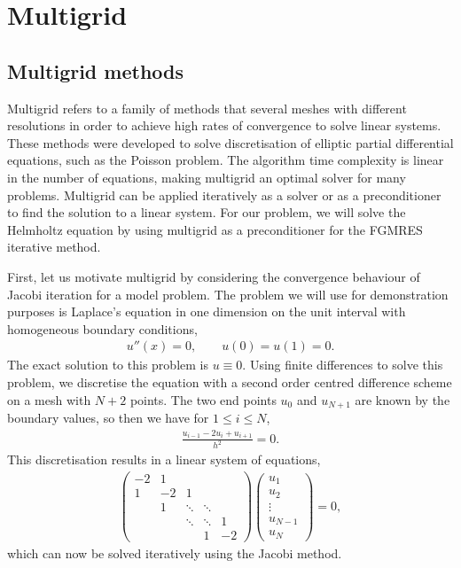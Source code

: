 \chapter{Multigrid}
\label{sec:mg}


\section{Multigrid methods}

Multigrid refers to a family of methods that several meshes with different resolutions in order to achieve high rates of convergence to solve linear systems.
These methods were developed to solve discretisation of elliptic partial differential equations, such as the Poisson problem.
The algorithm time complexity is linear in the number of equations, making multigrid an optimal solver for many problems.
Multigrid can be applied iteratively as a solver or as a preconditioner to find the solution to a linear system.
For our problem, we will solve the Helmholtz equation by using multigrid as a preconditioner for the FGMRES iterative method.

First, let us motivate multigrid by considering the convergence behaviour of Jacobi iteration for a model problem.
The problem we will use for demonstration purposes is Laplace's equation in one dimension on the unit interval with homogeneous boundary conditions,
\begin{align}
	u''(x) = 0, \qquad u(0)=u(1)=0.
\end{align}
The exact solution to this problem is $u\equiv 0$.
Using finite differences to solve this problem, we discretise the equation with a second order centred difference scheme on a mesh with $N+2$ points.
The two end points $u_0$ and $u_{N+1}$ are known by the boundary values, so then we have for $1 \leq i \leq N$,
\begin{align}
	\frac{u_{i-1} - 2u_i + u_{i+1}}{h^2} = 0.
\end{align}
This discretisation results in a linear system of equations,
\begin{align}
	\begin{pmatrix}
		-2 	& 	1 	& & \\
		1	&	-2	&	1	& \\
		& 1 & \ddots & \ddots & \\
		 && \ddots & \ddots & 1 \\
		&&&1&-2
	\end{pmatrix} \begin{pmatrix}
		u_1 \\ u_2 \\ \vdots \\ u_{N-1} \\ u_N
	\end{pmatrix} = 0,
\end{align} 
which can now be solved iteratively using the Jacobi method.

